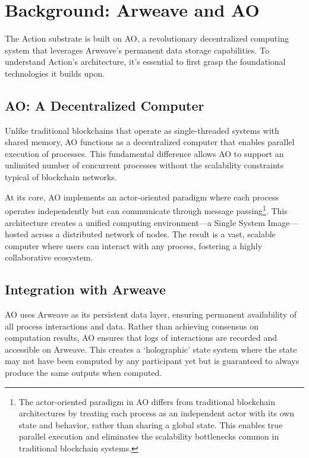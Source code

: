 \section{Background: Arweave and AO}

The Action substrate is built on AO, a revolutionary decentralized computing system that leverages Arweave's permanent data storage capabilities. To understand Action's architecture, it's essential to first grasp the foundational technologies it builds upon.

\subsection{AO: A Decentralized Computer}

Unlike traditional blockchains that operate as single-threaded systems with shared memory, AO functions as a decentralized computer that enables parallel execution of processes. This fundamental difference allows AO to support an unlimited number of concurrent processes without the scalability constraints typical of blockchain networks.

At its core, AO implements an actor-oriented paradigm where each process operates independently but can communicate through message passing\footnote{The actor-oriented paradigm in AO differs from traditional blockchain architectures by treating each process as an independent actor with its own state and behavior, rather than sharing a global state. This enables true parallel execution and eliminates the scalability bottlenecks common in traditional blockchain systems.}. This architecture creates a unified computing environment---a Single System Image---hosted across a distributed network of nodes. The result is a vast, scalable computer where users can interact with any process, fostering a highly collaborative ecosystem.

\subsection{Integration with Arweave}

AO uses Arweave as its persistent data layer, ensuring permanent availability of all process interactions and data. \cite{Williams2023} Rather than achieving consensus on computation results, AO ensures that logs of interactions are recorded and accessible on Arweave. This creates a `holographic' state system where the state may not have been computed by any participant yet but is guaranteed to always produce the same outputs when computed. \cite{Williams2024}

